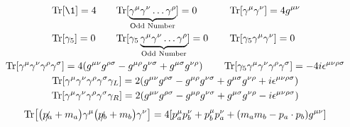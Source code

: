 \begin{gather*}
        \begin{alignedat}{3}
                &\Tr[\1] = 4
                \qquad
                &&\mathrm{Tr}[\underbrace{\gamma^\mu\gamma^\nu\dots\gamma^\rho}_{\mathclap{\text{Odd Number}}}] = 0
                \qquad
                &&\Tr[\gamma^\mu\gamma^\nu] = 4g^{\mu\nu}
                \\
                &\Tr[\gamma_5] = 0
                \qquad
                &&\mathrm{Tr}[\gamma_5\underbrace{\gamma^\mu\gamma^\nu\dots\gamma^\rho}_{\mathclap{\text{Odd Number}}}] = 0
                \qquad
                &&\Tr[\gamma_5\gamma^\mu\gamma^\nu] = 0
        \end{alignedat}
        \\
        \Tr[\gamma^\mu\gamma^\nu\gamma^\rho\gamma^\sigma] = 4\qty(g^{\mu\nu}g^{\rho\sigma} - g^{\mu\rho}g^{\nu\sigma} + g^{\mu\sigma}g^{\nu\rho})
        \qquad
        \Tr[\gamma_5\gamma^\mu\gamma^\nu\gamma^\rho\gamma^\sigma] = -4i\epsilon^{\mu\nu\rho\sigma}
        \\
        \Tr[\gamma^\mu\gamma^\nu\gamma^\rho\gamma^\sigma\gamma_L] = 2\qty(g^{\mu\nu}g^{\rho\sigma} - g^{\mu\rho}g^{\nu\sigma} + g^{\mu\sigma}g^{\nu\rho} + i\epsilon^{\mu\nu\rho\sigma})
        \\
        \Tr[\gamma^\mu\gamma^\nu\gamma^\rho\gamma^\sigma\gamma_R] = 2\qty(g^{\mu\nu}g^{\rho\sigma} - g^{\mu\rho}g^{\nu\sigma} + g^{\mu\sigma}g^{\nu\rho} - i\epsilon^{\mu\nu\rho\sigma})
\end{gather*}
\begin{equation*}
        \Tr[\qty(\slashed{p_a}+m_a)\gamma^\mu\qty(\slashed{p_b}+m_b)\gamma^\nu]
        = 4\qty[p_a^{\mu}p_b^{\nu} + p_b^{\mu}p_a^{\nu} + \qty(m_am_b - p_a\cdot p_b)g^{\mu\nu}]
\end{equation*}
